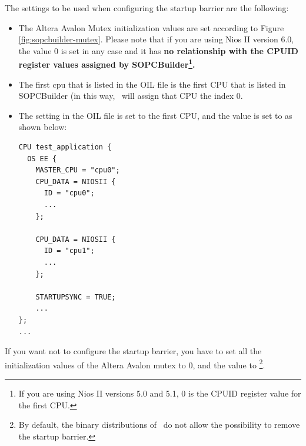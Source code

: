 The settings to be used when configuring the startup barrier are the
following: 

\begin{itemize}
\item The Altera Avalon Mutex initialization values are set according
  to Figure \ref{fig:sopcbuilder-mutex}. Please note that if you are
  using Nios II version 6.0, the value $0$ is set in any case and it
  has \bf{no relationship} with the CPUID register values assigned by
  SOPCBuilder\footnote{If you are using Nios II versions 5.0 and 5.1,
  $0$ is the CPUID register value for the first CPU.}.

\item The first cpu that is listed in the OIL file is the first CPU
  that is listed in SOPCBuilder (in this way, \rtd\ will assign
  that CPU the index $0$.

\item The  setting in the OIL file is set
  to the first CPU, and the  value is set to
   as shown below: 
\begin{lstlisting}
CPU test_application {
  OS EE {
    MASTER_CPU = "cpu0";			
    CPU_DATA = NIOSII {
      ID = "cpu0";
      ...
    };
    
    CPU_DATA = NIOSII {
      ID = "cpu1";
      ...
    };
    
    STARTUPSYNC = TRUE;
    ...
};
...
\end{lstlisting}

\end{itemize}

If you want not to configure the startup barrier, you have to set all
the initialization values of the Altera Avalon mutex to 0, and the
 value to \footnote{By default, the
binary distributions of \ee\ do not allow the possibility to remove
the startup barrier.}.

